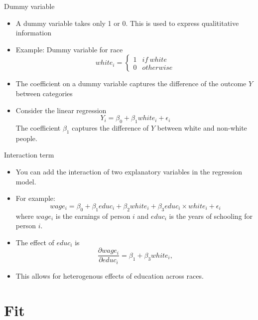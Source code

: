 \documentclass[
  ignorenonframetext,
]{beamer}
\providecommand{\tightlist}{%
  \setlength{\itemsep}{0pt}\setlength{\parskip}{0pt}}
\begin{document}
\begin{frame}{Dummy variable}
\protect\hypertarget{dummy-variable}{}

\begin{itemize}
\tightlist
\item
  A dummy variable takes only 1 or 0. This is used to express
  qualititative information
\item
  Example: Dummy variable for race \[
  white_{i}=\begin{cases}
  1 & if\ white\\
  0 & otherwise
  \end{cases} 
   \]
\item
  The coefficient on a dummy variable captures the difference of the
  outcome \(Y\) between categories
\item
  Consider the linear regression \[
    Y_i = \beta_0 + \beta_1 white_i + \epsilon_i
    \] The coefficient \(\beta_1\) captures the difference of \(Y\)
  between white and non-white people.
\end{itemize}

\end{frame}

\begin{frame}{Interaction term}
\protect\hypertarget{interaction-term}{}

\begin{itemize}
\tightlist
\item
  You can add the interaction of two explanatory variables in the
  regression model.
\item
  For example: \[
    wage_i = \beta_0 + \beta_1 educ_i + \beta_2 white_i + \beta_3 educ_i \times white_i + \epsilon_i
    \] where \(wage_i\) is the earnings of person \(i\) and \(educ_i\)
  is the years of schooling for person \(i\).
\item
  The effect of \(educ_i\) is \[
    \frac{\partial wage_i}{\partial educ_i} = \beta_1 + \beta_3 white_i,
  \]
\item
  This allows for heterogenous effects of education across races.
\end{itemize}

\end{frame}

\hypertarget{fit}{%
\section{Fit}\label{fit}}
\end{document}
